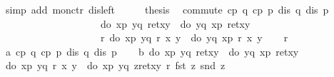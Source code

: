 \begin{isabellebody}
\ {\isacharparenleft}simp\ add{\isacharcolon}\ mon{\isacharunderscore}ctr\ dis{\isacharunderscore}left{}{\isacharparenright}\isanewline
\ \ \isamarkupfalse%
\ \isamarkupfalse%
\ {\isacharquery}thesis\ \isamarkupfalse%
\isacommand{{\isachardot}}\isanewline
\isamarkupfalse%
\isanewline
\isanewline
\isanewline
\isamarkupfalse%
\ commute{\isacharunderscore}{}{\isacharunderscore}{}{\isacharcolon}\ {\isachardoublequote}{\isasymlbrakk}cp\ q{\isacharsemicolon}\ cp\ p{\isacharsemicolon}\ dis\ q{\isacharsemicolon}\ dis\ p{\isasymrbrakk}\ {\isasymLongrightarrow}\ \isanewline
\ \ \ \ \ \ \ \ \ \ \ \ \ \ \ \ \ \ \ \ do\ {\isacharbraceleft}x{\isasymleftarrow}p{\isacharsemicolon}\ y{\isasymleftarrow}q{\isacharsemicolon}\ ret{\isacharparenleft}x{\isacharcomma}y{\isacharparenright}{\isacharbraceright}\ {\isacharequal}\ do\ {\isacharbraceleft}y{\isasymleftarrow}q{\isacharsemicolon}\ x{\isasymleftarrow}p{\isacharsemicolon}\ ret{\isacharparenleft}x{\isacharcomma}y{\isacharparenright}{\isacharbraceright}\ {\isasymLongrightarrow}\isanewline
\ \ \ \ \ \ \ \ \ \ \ \ \ \ \ \ \ \ \ \ {\isasymforall}r{\isachardot}\ do\ {\isacharbraceleft}x{\isasymleftarrow}p{\isacharsemicolon}\ y{\isasymleftarrow}q{\isacharsemicolon}\ r\ x\ y{\isacharbraceright}\ {\isacharequal}\ do\ {\isacharbraceleft}y{\isasymleftarrow}q{\isacharsemicolon}\ x{\isasymleftarrow}p{\isacharsemicolon}\ r\ x\ y{\isacharbraceright}{\isachardoublequote}\isanewline
\isamarkupfalse%
\isanewline
\ \ \isamarkupfalse%
\ r\isanewline
\ \ \isamarkupfalse%
\ a{\isacharcolon}\ {\isachardoublequote}cp\ q{\isachardoublequote}\ {\isachardoublequote}cp\ p{\isachardoublequote}\ {\isachardoublequote}dis\ q{\isachardoublequote}\ {\isachardoublequote}dis\ p{\isachardoublequote}\isanewline
\ \ \isamarkupfalse%
\ b{\isacharcolon}\ {\isachardoublequote}do\ {\isacharbraceleft}x{\isasymleftarrow}p{\isacharsemicolon}\ y{\isasymleftarrow}q{\isacharsemicolon}\ ret{\isacharparenleft}x{\isacharcomma}y{\isacharparenright}{\isacharbraceright}\ {\isacharequal}\ do\ {\isacharbraceleft}y{\isasymleftarrow}q{\isacharsemicolon}\ x{\isasymleftarrow}p{\isacharsemicolon}\ ret{\isacharparenleft}x{\isacharcomma}y{\isacharparenright}{\isacharbraceright}{\isachardoublequote}\isanewline
\ \ \isamarkupfalse%
\ {\isachardoublequote}do\ {\isacharbraceleft}x{\isasymleftarrow}p{\isacharsemicolon}\ y{\isasymleftarrow}q{\isacharsemicolon}\ r\ x\ y{\isacharbraceright}\ {\isacharequal}\ do\ {\isacharbraceleft}x{\isasymleftarrow}p{\isacharsemicolon}\ y{\isasymleftarrow}q{\isacharsemicolon}\ z{\isasymleftarrow}ret{\isacharparenleft}x{\isacharcomma}y{\isacharparenright}{\isacharsemicolon}\ r\ {\isacharparenleft}fst\ z{\isacharparenright}\ {\isacharparenleft}snd\ z{\isacharparenright}{\isacharbraceright}{\isachardoublequote}\isanewline

\end{isabellebody}
